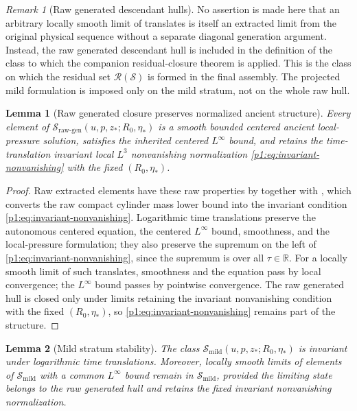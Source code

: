 \documentclass[11pt]{amsart}
\theoremstyle{plain}
\newtheorem{lemma}[lemma]{Lemma}
\theoremstyle{definition}
\theoremstyle{remark}
\newtheorem{remark}[remark]{Remark}
\numberwithin{equation}{section}
\newcommand{\R}{\mathbb R}
\newcommand{\calS}{\mathcal S}
\newcommand{\calR}{\mathcal R}
\begin{document}
\begin{remark}[Raw generated descendant hulls]
\label{p1:rem:generated-hull}
No assertion is made here that an arbitrary locally smooth limit of translates
is itself an extracted limit from the original physical sequence without a
separate diagonal generation argument.  Instead, the raw generated descendant
hull is included in the definition of the class to which the companion
residual-closure theorem is applied.  This is the class on which the residual set
\(\calR(\calS)\) is formed in the final assembly.  The projected mild
formulation is imposed only on the mild stratum, not on the whole raw hull.
\end{remark}

\begin{lemma}[Raw generated closure preserves normalized ancient structure]
\label{p1:lem:raw-generated-closure-stability}
Every element of
\(\calS_{\mathrm{raw\text{-}gen}}(u,p,z_*;R_0,\eta_*)\) is a smooth bounded
centered ancient local-pressure solution, satisfies the inherited centered
\(L^\infty\) bound, and
retains the time-translation invariant local \(L^3\) nonvanishing
normalization \eqref{p1:eq:invariant-nonvanishing} with the fixed
\((R_0,\eta_*)\).
\end{lemma}

\begin{proof}
Raw extracted elements have these raw properties by
 together with
, which converts the raw compact
cylinder mass lower bound into the invariant condition
\eqref{p1:eq:invariant-nonvanishing}.  Logarithmic time translations
preserve the autonomous centered equation, the centered
\(L^\infty\) bound, smoothness, and the local-pressure formulation; they also
preserve the supremum on the left of
\eqref{p1:eq:invariant-nonvanishing}, since the supremum is over all
\(\tau\in\R\).  For a locally smooth limit of such translates, smoothness
and the equation pass by local convergence; the \(L^\infty\) bound passes
by pointwise convergence.  The raw generated hull is closed only under limits
retaining the invariant nonvanishing condition with the fixed \((R_0,\eta_*)\),
so \eqref{p1:eq:invariant-nonvanishing} remains part of the structure.
\end{proof}

\begin{lemma}[Mild stratum stability]
\label{p1:lem:mild-stratum-stability}
The class \(\calS_{\mathrm{mild}}(u,p,z_*;R_0,\eta_*)\) is invariant under
logarithmic time translations.  Moreover, locally smooth limits of elements of
\(\calS_{\mathrm{mild}}\) with a common \(L^\infty\) bound remain in
\(\calS_{\mathrm{mild}}\), provided the limiting state belongs to the raw
generated hull and retains the fixed invariant nonvanishing normalization.
\end{lemma}
\end{document}
